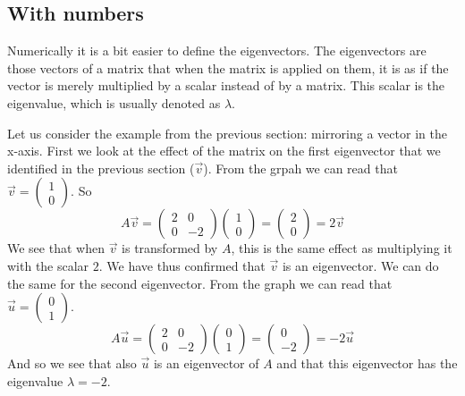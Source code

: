 \documentclass[a4paper]{report}
\begin{document}
\subsection{With numbers}
Numerically it is a bit easier to define the eigenvectors. The eigenvectors are those vectors of a matrix that when the matrix is applied  on them, it is as if the vector is merely multiplied by a scalar instead of by a matrix. This scalar is the eigenvalue, which is usually denoted as $\lambda$.

Let us consider the example from the previous section: mirroring a vector in the x-axis. First we look at the effect of the matrix on the first eigenvector that we identified in the previous section ($\vec{v}$). From the grpah we can read that $\vec{v}=\begin{pmatrix}1\\0\end{pmatrix}$. So
\begin{equation}
A\vec{v} = \begin{pmatrix} 2 & 0 \\ 0 & -2 \end{pmatrix} \begin{pmatrix} 1 \\ 0 \end{pmatrix} = \begin{pmatrix} 2 \\ 0 \end{pmatrix} = 2\vec{v}
\end{equation}
We see that when $\vec{v}$ is transformed by $A$, this is the same effect as multiplying it with the scalar $2$. We have thus confirmed that $\vec{v}$ is an eigenvector. We can do the same for the second eigenvector. From the graph we can read that $\vec{u}=\begin{pmatrix}0\\1\end{pmatrix}$.
\begin{equation}
A\vec{u} = \begin{pmatrix} 2 & 0 \\ 0 & -2 \end{pmatrix} \begin{pmatrix} 0 \\ 1 \end{pmatrix} = \begin{pmatrix} 0 \\ -2 \end{pmatrix} = -2\vec{u}
\end{equation}
And so we see that also $\vec{u}$ is an eigenvector of $A$ and that this eigenvector has the eigenvalue $\lambda=-2$.
\end{document}
